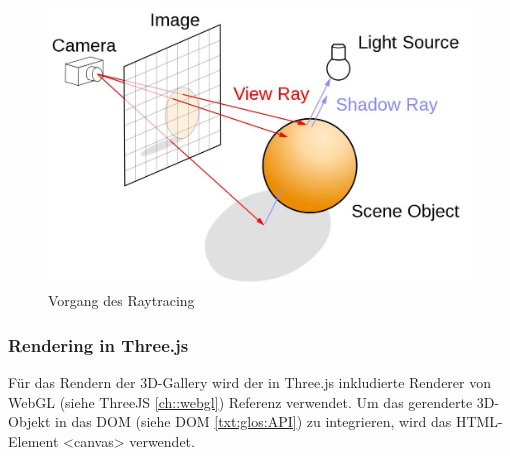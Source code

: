 \begin{figure} [h]
    \centering
    \includegraphics[scale=0.3]{pics/ray-tracing.jpg}
    \caption{Vorgang des Raytracing \cite{RayTracingRasterization}}
    \label{fig:impl:ray-tracing}
\end{figure}


\subsubsection{Rendering in Three.js}
Für das Rendern der 3D-Gallery wird der in Three.js inkludierte Renderer von WebGL (siehe ThreeJS \ref{ch::webgl}) Referenz verwendet. Um das gerenderte 3D-Objekt in das DOM (siehe DOM \ref{txt:glos:API}) zu integrieren, wird das HTML-Element <canvas> verwendet. \cite{ThreejsWebGLRenderer}

